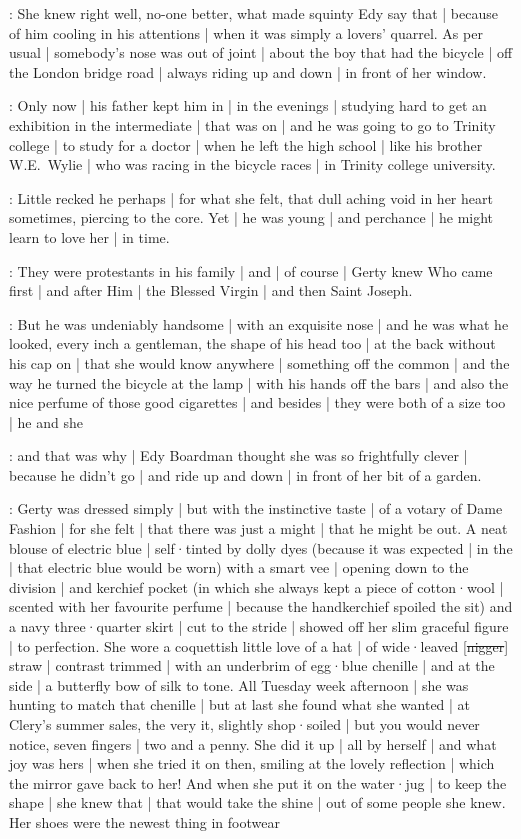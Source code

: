 \gertyJudgy:
She knew right well,
no-one better,
what made squinty Edy say that |
because of him cooling in his attentions |
when it was simply a lovers' quarrel.
As per usual |
somebody's nose was out of joint |%
about the boy that had the bicycle |
off the London bridge road |
always riding up and down |
in front of her window.

\gertyReal:
Only now |
his father kept him in |
in the evenings |
studying hard to get an exhibition in the intermediate |
that was on |
and he was going to go to Trinity college |
to study for a doctor |
when he left the high school |
like his brother W.E.~Wylie |
who was racing in the bicycle races |
in Trinity college university.

\gertyRomantic:
Little recked he perhaps |
for what she felt,
that dull aching void in her heart sometimes,
piercing to the core.
Yet |
he was young |
and perchance |
he might learn to love her |
in time.

\gertyReal:
They were protestants in his family |
and |
of course |
Gerty knew Who came first |
and after Him |
the Blessed Virgin |
and then Saint Joseph.%

\gertyRomantic:
But he was undeniably handsome |
with an exquisite nose |
and he was what he looked,
every inch a gentleman,
the shape of his head too |
at the back without his cap on |
that she would know anywhere |
something off the common |
and the way he turned the bicycle at the lamp |
with his hands off the bars |
and also the nice perfume of those good cigarettes |
and besides |
they were both of a size too |
he and she

\gertyJudgy:
and that was why |
Edy Boardman thought she was so frightfully clever |
because he didn't go |
and ride up and down |
in front of her bit of a garden.

\gertyReal:
Gerty was dressed simply |
but with the instinctive taste |
of a votary of Dame Fashion |
for she felt |
that there was just a might |
that he might be out.
A neat blouse of electric blue |
self·tinted by dolly dyes
(because it was expected |
in the  |
that electric blue would be worn)
with a smart vee |
opening down to the division |
and kerchief pocket
(in which
she always kept a piece of cotton·wool |
scented with her favourite perfume |
because the handkerchief spoiled the sit)
and a navy three·quarter skirt |
cut to the stride |
showed off her slim graceful figure |
to perfection.
She wore a coquettish little love of a hat |
of wide·leaved [\sout{nigger}] straw |
contrast trimmed |
with an underbrim of egg·blue chenille |
and at the side |
a butterfly bow of silk to tone.
All Tuesday week afternoon |
she was hunting to match that chenille |
but at last
she found what she wanted |
at Clery's summer sales,
the very it,
slightly shop·soiled |
but you would never notice,%
seven fingers |
two and a penny.
She did it up |
all by herself |
and what joy was hers |
when she tried it on then,
smiling at the lovely reflection |
which the mirror gave back to her!
And when she put it on the water·jug |
to keep the shape |
she knew that |
that would take the shine |
out of some people she knew.
Her shoes were the newest thing in footwear

